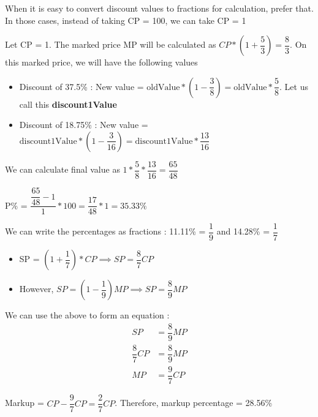 \begin{NOTE}
    When it is easy to convert discount values to fractions for calculation, prefer that. In those cases, instead of taking CP = 100, we can take CP = 1
\end{NOTE}

Let CP = 1. The marked price MP will be calculated as $CP * (1 + \dfrac{5}{3}) = \dfrac{8}{3}$. On this marked price, we will have the following values

\begin{itemize}
    \item Discount of 37.5\% : New value = $\text{oldValue} * ( 1 - \dfrac{3}{8}) = \text{oldValue} * \dfrac{5}{8}$. Let us call this \textbf{discount1Value}

    \item Discount of 18.75\% : New value = $\text{discount1Value} * ( 1 - \dfrac{3}{16}) = \text{discount1Value} * \dfrac{13}{16}$
\end{itemize}

We can calculate final value as $1 * \dfrac{5}{8} * \dfrac{13}{16} = \dfrac{65}{48}$

P\% = $\dfrac{\dfrac{65}{48} - 1}{1} * 100 = \dfrac{17}{48} * 1 = 35.33\%$


We can write the percentages as fractions : 11.11\% = $\dfrac{1}{9}$ and 14.28\% = $\dfrac{1}{7}$

\begin{itemize}
    \item SP = $(1 + \dfrac{1}{7}) * CP \implies SP = \dfrac{8}{7} CP$
    \item However, $SP = (1 - \dfrac{1}{9}) MP \implies SP = \dfrac{8}{9} MP$
\end{itemize}

We can use the above to form an equation : 
\begin{align*}
    SP &= \dfrac{8}{9} MP \\
    \dfrac{8}{7} CP &= \dfrac{8}{9} MP \\
    MP &= \dfrac{9}{7} CP
\end{align*}

Markup = $CP - \dfrac{9}{7} CP = \dfrac{2}{7}CP$. Therefore, markup percentage = 28.56\%



